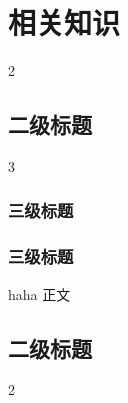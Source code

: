 ﻿\chapter{相关知识}
 2
\section{二级标题}
 3
\subsection{三级标题}
\subsection{三级标题}
 haha
 正文
\section{二级标题}
 2